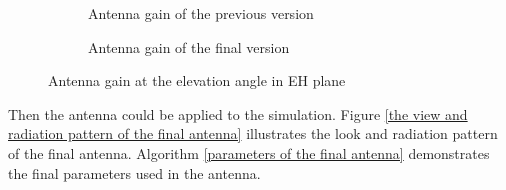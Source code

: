 \documentclass[12pt,DIV14,BCOR12mm,a4paper,footinclude=false,headinclude,parskip=half-,twoside,openright,cleardoublepage=empty,toc=index,bibliography=totoc,listof=totoc]{scrreprt}
\numberwithin{equation}{chapter}
\begin{document}
\begin{figure}[t]
    \centering
    \begin{subfigure}{0.45\textwidth}
        \centering
        \caption{Antenna gain of the previous version}
        \label{antenna gain of the previous version}
    \end{subfigure}
    \begin{subfigure}{0.45\textwidth}
        \centering
        \caption{Antenna gain of the final version}
        \label{antenna gain of the final version}
    \end{subfigure}
    \caption{Antenna gain at the elevation angle in EH plane}
    \label{antenna gain at the elevation angle in EH plane}
\end{figure}

Then the antenna could be applied to the simulation. Figure \ref{the view and radiation pattern of the final antenna} illustrates the look and radiation pattern of the final antenna. Algorithm \ref{parameters of the final antenna} demonstrates the final parameters used in the antenna.
\end{document}
